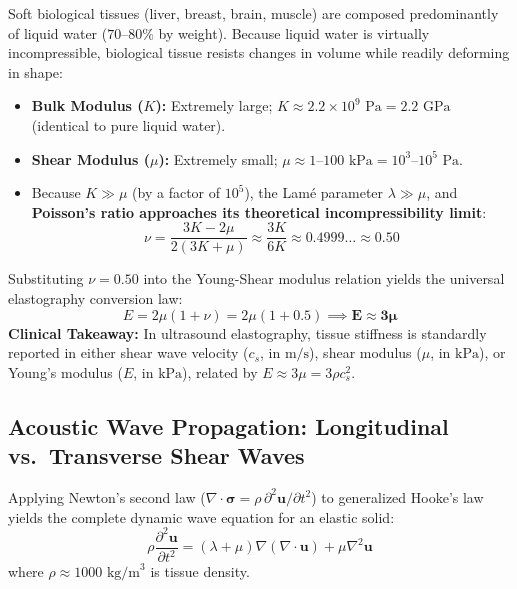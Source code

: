 \documentclass[11pt,a4paper]{article}
\begin{document}
\begin{physicsbox}
Soft biological tissues (liver, breast, brain, muscle) are composed predominantly of liquid water ($70\text{--}80\%$ by weight). Because liquid water is virtually incompressible, biological tissue resists changes in volume while readily deforming in shape:
\begin{itemize}
    \item \textbf{Bulk Modulus ($K$):} Extremely large; $K \approx 2.2 \times 10^9\text{ Pa} = 2.2\text{ GPa}$ (identical to pure liquid water).
    \item \textbf{Shear Modulus ($\mu$):} Extremely small; $\mu \approx 1\text{--}100\text{ kPa} = 10^3\text{--}10^5\text{ Pa}$.
    \item Because $K \gg \mu$ (by a factor of $10^5$), the Lamé parameter $\lambda \gg \mu$, and \textbf{Poisson's ratio approaches its theoretical incompressibility limit}:
    \begin{equation}
        \nu = \frac{3K - 2\mu}{2(3K + \mu)} \approx \frac{3K}{6K} \approx \mathbf{0.4999\dots \approx 0.50}
    \end{equation}
\end{itemize}
Substituting $\nu = 0.50$ into the Young-Shear modulus relation yields the universal elastography conversion law:
\begin{equation}
    E = 2\mu(1 + \nu) = 2\mu(1 + 0.5) \implies \mathbf{E \approx 3\mu}
\end{equation}
\textbf{Clinical Takeaway:} In ultrasound elastography, tissue stiffness is standardly reported in either shear wave velocity ($c_s$, in $\text{m/s}$), shear modulus ($\mu$, in $\text{kPa}$), or Young's modulus ($E$, in $\text{kPa}$), related by $E \approx 3\mu = 3\rho c_s^2$.
\end{physicsbox}

\subsection{Acoustic Wave Propagation: Longitudinal vs.\ Transverse Shear Waves}
Applying Newton's second law ($\nabla \cdot \boldsymbol{\sigma} = \rho \, \partial^2 \mathbf{u} / \partial t^2$) to generalized Hooke's law yields the complete dynamic wave equation for an elastic solid:
\begin{equation}
    \rho \frac{\partial^2 \mathbf{u}}{\partial t^2} = (\lambda + \mu) \nabla (\nabla \cdot \mathbf{u}) + \mu \nabla^2 \mathbf{u}
\end{equation}
where $\rho \approx 1000\text{ kg/m}^3$ is tissue density. 
\end{document}
